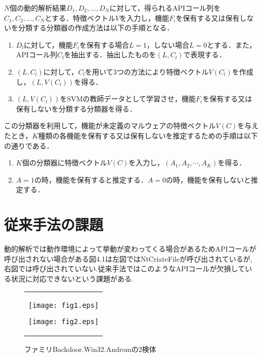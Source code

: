 \documentclass{thesis}
\begin{document}
$N$個の動的解析結果$D_1,D_2,...,D_N$に対して，得られるAPIコール列を$C_1,C_2,...,C_N$とする．特徴ベクトル$V$を入力し，機能$F_i$を保有する又は保有しないを分類する分類器の作成方法は以下の手順となる．

\begin{enumerate}[(1)]
\item $D_l$に対して，機能$F_i$を保有する場合$L=1$，しない場合$L=0$とする．また，APIコール列$C_l$を抽出する．抽出したものを$(L,C_l)$で表現する．
\item $(L,C_l)$に対して，$C_l$を用いて3つの方法により特徴ベクトル$V(C_l)$を作成し，$(L, V(C_l))$を得る．
\item $(L, V(C_l))$をSVMの教師データとして学習させ，機能$F_i$を保有する又は保有しないを分類する分類器を得る．
\end{enumerate}

この分類器を利用して，機能が未定義のマルウェアの特徴ベクトル$V(C)$を与えたとき，$K$種類の各機能を保有する又は保有しないを推定するための手順は以下の通りである．

\begin{enumerate}
\item $K$個の分類器に特徴ベクトル$V(C)$を入力し，$(A_1, A_2, \cdots , A_K)$を得る．
\item $A=1$の時，機能を保有すると推定する．$A=0$の時，機能を保有しないと推定する．
\end{enumerate}
\section{従来手法の課題}
動的解析では動作環境によって挙動が変わってくる場合があるためAPIコールが呼び出されない場合がある図4.1は左図ではNtCriateFileが呼び出されているが,右図では呼び出されていない.従来手法ではこのようなAPIコールが欠損している状況に対応できないという課題がある.

\begin{figure}[htbp]
\begin{center}
  \begin{tabular}{c}

    \begin{minipage}{0.5\hsize}
      \begin{center}
        \texttt{[image: fig1.eps]}

      \end{center}
    \end{minipage}

    \begin{minipage}{0.5\hsize}
      \begin{center}
        \texttt{[image: fig2.eps]}
      \end{center}
    \end{minipage}

  \end{tabular}
  \caption{ ファミリBackdoor.Win32.Andromの2検体}
  \end{center}
\end{figure}
\end{document}

